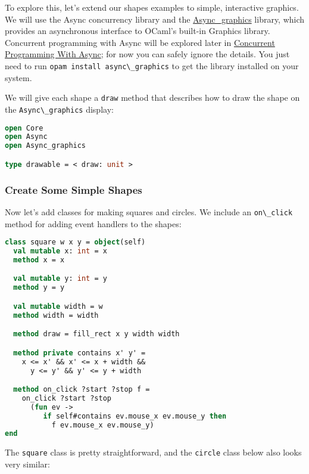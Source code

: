 To explore this, let's extend our shapes examples to simple, interactive
graphics. We will use the Async concurrency library and the
\href{http://github.com/lpw25/async_graphics/}{Async\_graphics} library,
which provides an asynchronous interface to OCaml's built-in Graphics
library. Concurrent programming with Async will be explored later in
\href{concurrent-programming.html\#concurrent-programming-with-async}{Concurrent
Programming With Async}; for now you can safely ignore the details. You
just need to run \passthrough{\lstinline!opam install async\_graphics!}
to get the library installed on your system.

We will give each shape a \passthrough{\lstinline!draw!} method that
describes how to draw the shape on the
\passthrough{\lstinline!Async\_graphics!} display:

\begin{lstlisting}[language=Caml]
open Core
open Async
open Async_graphics

type drawable = < draw: unit >
\end{lstlisting}

\hypertarget{create-some-simple-shapes}{%
\subsubsection{Create Some Simple
Shapes}\label{create-some-simple-shapes}}

Now let's add classes for making squares and circles. We include an
\passthrough{\lstinline!on\_click!} method for adding event handlers to
the shapes: 

\begin{lstlisting}[language=Caml]
class square w x y = object(self)
  val mutable x: int = x
  method x = x

  val mutable y: int = y
  method y = y

  val mutable width = w
  method width = width

  method draw = fill_rect x y width width

  method private contains x' y' =
    x <= x' && x' <= x + width &&
      y <= y' && y' <= y + width

  method on_click ?start ?stop f =
    on_click ?start ?stop
      (fun ev ->
         if self#contains ev.mouse_x ev.mouse_y then
           f ev.mouse_x ev.mouse_y)
end
\end{lstlisting}

The \passthrough{\lstinline!square!} class is pretty straightforward,
and the \passthrough{\lstinline!circle!} class below also looks very
similar:

